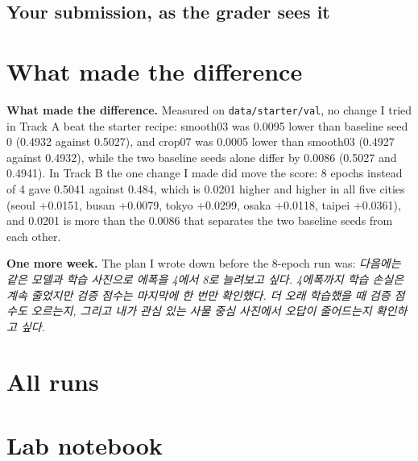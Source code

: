 \documentclass[11pt]{article}
\begin{document}
\subsection*{Your submission, as the grader sees it}


\section*{What made the difference}

\textbf{What made the difference.} Measured on \texttt{data/starter/val}, no
change I tried in Track A beat the starter recipe: smooth03 was 0.0095 lower
than baseline seed 0 (0.4932 against 0.5027), and crop07 was 0.0005 lower than
smooth03 (0.4927 against 0.4932), while the two baseline seeds alone differ by
0.0086 (0.5027 and 0.4941). In Track B the one change I made did move the
score: 8 epochs instead of 4 gave 0.5041 against 0.484, which is 0.0201 higher
and higher in all five cities (seoul +0.0151, busan +0.0079, tokyo +0.0299,
osaka +0.0118, taipei +0.0361), and 0.0201 is more than the 0.0086 that
separates the two baseline seeds from each other.

\textbf{One more week.} The plan I wrote down before the 8-epoch run was:
\emph{다음에는 같은 모델과 학습 사진으로 에폭을 4에서
8로 늘려보고 싶다. 4에폭까지 학습 손실은 계속 줄었지만 검증 점수는 마지막에 한
번만 확인했다. 더 오래 학습했을 때 검증 점수도 오르는지, 그리고 내가 관심 있는
사물 중심 사진에서 오답이 줄어드는지 확인하고 싶다.}

\section*{All runs}

\section*{Lab notebook}
\end{document}
